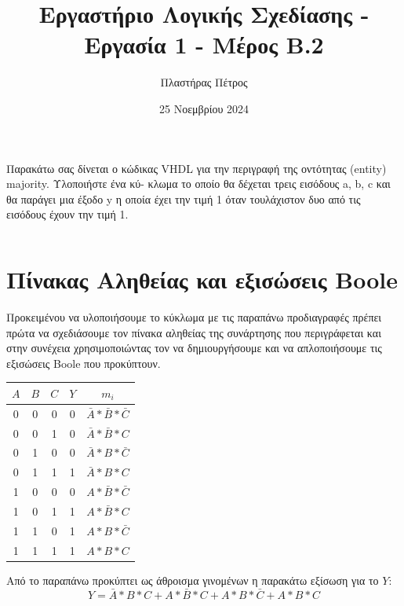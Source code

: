 \documentclass[]{article}
\begin{document}
\author{Πλαστήρας Πέτρος}
\title{Εργαστήριο Λογικής Σχεδίασης - Εργασία 1 - Μέρος Β.2}
\date{25 Νοεμβρίου 2024}
\maketitle

Παρακάτω σας δίνεται ο κώδικας VHDL για την περιγραφή της οντότητας (entity) majority. Υλοποιήστε ένα κύ-
κλωμα το οποίο θα δέχεται τρεις εισόδους a, b, c και θα παράγει μια έξοδο y η οποία έχει την τιμή 1 όταν τουλάχιστον δυο από τις εισόδους έχουν την τιμή 1.
\inputminted{vhdl}{majority.vhdl}

\section{Πίνακας Αληθείας και εξισώσεις Boole}
Προκειμένου να υλοποιήσουμε το κύκλωμα με τις παραπάνω προδιαγραφές πρέπει πρώτα να
σχεδιάσουμε τον πίνακα αληθείας της συνάρτησης που περιγράφεται και στην συνέχεια
χρησιμοποιώντας τον να δημιουργήσουμε και να απλοποιήσουμε τις εξισώσεις Boole που προκύπτουν.
\begin{center}
	\begin{tabular}{ | c | c | c | c | c | }
		\hline \rule{0pt}{11pt} $A$ & $B$ & $C$ & $Y$ & $m_i$                         \\
		\hline \rule{0pt}{11pt} 0   & 0   & 0   & 0   & $\bar{A} * \bar{B} * \bar{C}$ \\
		\rule{0pt}{11pt} 0          & 0   & 1   & 0   & $\bar{A} * \bar{B} * C$       \\
		\rule{0pt}{11pt} 0          & 1   & 0   & 0   & $\bar{A} * B * \bar{C}$       \\
		\rule{0pt}{11pt} 0          & 1   & 1   & 1   & $\bar{A} * B * C$             \\
		\rule{0pt}{11pt} 1          & 0   & 0   & 0   & $A * \bar{B} * \bar{C}$       \\
		\rule{0pt}{11pt} 1          & 0   & 1   & 1   & $A * \bar{B} * C$             \\
		\rule{0pt}{11pt} 1          & 1   & 0   & 1   & $A * B * \bar{C}$             \\
		\rule{0pt}{11pt} 1          & 1   & 1   & 1   & $A * B * C$                   \\
		\hline
	\end{tabular}
\end{center}

Από το παραπάνω προκύπτει ως άθροισμα γινομένων η παρακάτω εξίσωση για το $Y$:
$$ Y = \bar{A} * B * C + A * \bar{B} * C + A * B * \bar{C} + A * B * C$$
\end{document}
